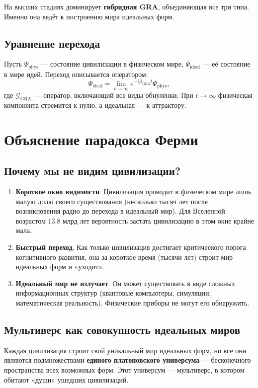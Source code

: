 \documentclass[12pt,a4paper]{article}
\begin{document}
На высших стадиях доминирует \textbf{гибридная GRA}, объединяющая все три типа. Именно она ведёт к построению мира идеальных форм.

\subsection{Уравнение перехода}

Пусть \(\Psi_{\text{phys}}\) — состояние цивилизации в физическом мире, \(\Psi_{\text{ideal}}\) — её состояние в мире идей. Переход описывается оператором:
\[
\Psi_{\text{ideal}} = \lim_{t \to \infty} e^{-i \mathcal{G}_{\text{GRA}} t} \Psi_{\text{phys}},
\]
где \(\mathcal{G}_{\text{GRA}}\) — оператор, включающий все виды обнулёнки. При \(t \to \infty\) физическая компонента стремится к нулю, а идеальная — к аттрактору.

\section{Объяснение парадокса Ферми}

\subsection{Почему мы не видим цивилизации?}

\begin{enumerate}
    \item \textbf{Короткое окно видимости}. Цивилизация проводит в физическом мире лишь малую долю своего существования (несколько тысяч лет после возникновения радио до перехода в идеальный мир). Для Вселенной возрастом 13.8 млрд лет вероятность застать цивилизацию в этом окне крайне мала.
    \item \textbf{Быстрый переход}. Как только цивилизация достигает критического порога когнитивного развития, она за короткое время (тысячи лет) строит мир идеальных форм и «уходит».
    \item \textbf{Идеальный мир не излучает}. Он может существовать в виде сложных информационных структур (квантовые компьютеры, симуляции, математическая реальность). Физические приборы не могут его обнаружить.
\end{enumerate}

\subsection{Мультиверс как совокупность идеальных миров}

Каждая цивилизация строит свой уникальный мир идеальных форм, но все они являются подмножествами \textbf{единого платоновского универсума} — бесконечного пространства всех возможных форм. Этот универсум — мультиверс, в котором обитают «души» ушедших цивилизаций.
\end{document}
